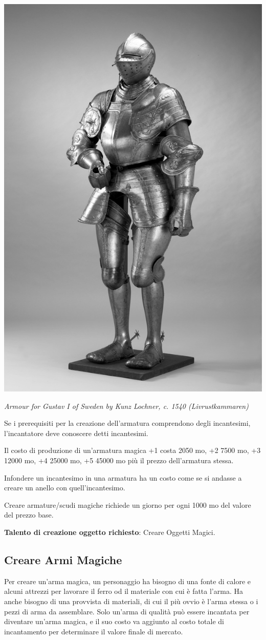 \begin{multicols}{2}
	\begin{center}
		\includegraphics[width=0.5\linewidth]{immagini/Rustning_Gustav_Vasa.png}

		\textit{Armour for Gustav I of Sweden by Kunz Lochner, c. 1540 (Livrustkammaren)}
	\end{center}

	Se i prerequisiti per la creazione dell'armatura comprendono degli incantesimi, l'incantatore deve conoscere detti incantesimi.

	Il costo di produzione di un'armatura magica +1 costa 2050 mo, +2 7500 mo, +3 12000 mo, +4 25000 mo, +5 45000 mo più il prezzo dell'armatura stessa.

	Infondere un incantesimo in una armatura ha un costo come se si andasse a creare un anello con quell'incantesimo.

	Creare armature/scudi magiche richiede un giorno per ogni 1000 mo del valore del prezzo base.

	\medskip

	\textbf{Talento di creazione oggetto richiesto}: Creare Oggetti Magici.

	\subsection{Creare Armi Magiche}

	Per creare un'arma magica, un personaggio ha bisogno di una fonte di calore e alcuni attrezzi per lavorare il ferro od il materiale con cui è fatta l'arma. Ha anche bisogno di una provvista di materiali, di cui il più ovvio è l'arma stessa o i pezzi di arma da assemblare. Solo un'arma di qualità può essere incantata per diventare un'arma magica, e il suo costo va aggiunto al costo totale di incantamento per determinare il valore finale di mercato.


\end{multicols}
